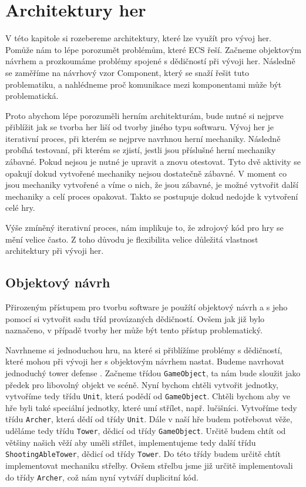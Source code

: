 \chapter{Architektury her}
V této kapitole si rozebereme architektury, které lze využít pro vývoj her. Pomůže nám to lépe porozumět problémům, které ECS řeší. Začneme objektovým návrhem a prozkoumáme problémy spojené s dědičností při vývoji her. Následně se zaměříme na návrhový vzor Component, který se snaží řešit tuto problematiku, a nahlédneme proč komunikace mezi komponentami může být problematická.

Proto abychom lépe porozuměli herním architekturám, bude nutné si nejprve přiblížit jak se tvorba her liší od tvorby jiného typu softwaru. Vývoj her je iterativní proces, při kterém se nejprve navrhnou herní mechaniky. Následně probíhá testovaní, při kterém se zjistí, jestli jsou příslušné herní mechaniky zábavné. Pokud nejsou je nutné je upravit a znovu otestovat. Tyto dvě aktivity se opakují dokud vytvořené mechaniky nejsou dostatečně zábavné. V moment co jsou mechaniky vytvořené a víme o nich, že jsou zábavné, je možné vytvořit další mechaniky a celí proces opakovat. Takto se postupuje dokud nedojde k vytvoření celé hry.

Výše zmíněný iterativní proces, nám implikuje to, že zdrojový kód pro hry se mění velice často. Z toho důvodu je flexibilita velice důležitá vlastnost architektury při vývoji her.

\section{Objektový návrh}
Přirozeným přístupem pro tvorbu software je použítí objektový návrh a s jeho pomocí si vytvořit sadu tříd provázaných dědičností. Ovšem jak již bylo naznačeno, v případě tvorby her může být tento přístup problematický.


Navrhneme si jednoduchou hru, na které si přiblížíme problémy s dědičností, které mohou při vývoji her s objektovým návrhem nastat. Budeme navrhovat jednoduchý tower defense . Začneme třídou \verb|GameObject|, ta nám bude sloužit jako předek pro libovolný objekt ve scéně. Nyní bychom chtěli vytvořit jednotky, vytvoříme tedy třídu \verb|Unit|, která podědí od \verb|GameObject|. Chtěli bychom aby ve hře byli také speciální jednotky, které umí střílet, např. lučišníci. Vytvoříme tedy třídu \verb|Archer|, která dědí od třídy \verb|Unit|. Dále v naší hře budem potřebovat věže, uděláme tedy třídu \verb|Tower|, dědicí od třídy \verb|GameObject|. Určitě budem chtít od většiny našich věží aby uměli střílet, implementujeme tedy další třídu \verb|ShootingAbleTower|, dědicí od třídy \verb|Tower|. Do této třídy budem určitě chtít implementovat mechaniku střelby. Ovšem střelbu jsme již určitě implementovali do třídy \verb|Archer|, což nám nyní vytváří duplicitní kód.

